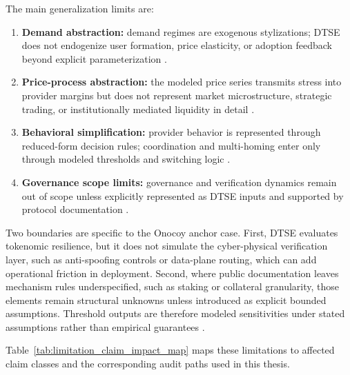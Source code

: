 The main generalization limits are:
\begin{enumerate}
    \item \textbf{Demand abstraction:} demand regimes are exogenous stylizations; DTSE does not endogenize user formation, price elasticity, or adoption feedback beyond explicit parameterization \cite{Morris2019, Braakman2022, Collins2024}.
    \item \textbf{Price-process abstraction:} the modeled price series transmits stress into provider margins but does not represent market microstructure, strategic trading, or institutionally mediated liquidity in detail \cite{Morris2019, Braakman2022, Collins2024}.
    \item \textbf{Behavioral simplification:} provider behavior is represented through reduced-form decision rules; coordination and multi-homing enter only through modeled thresholds and switching logic \cite{Morris2019, Braakman2022, Collins2024}.
    \item \textbf{Governance scope limits:} governance and verification dynamics remain out of scope unless explicitly represented as DTSE inputs and supported by protocol documentation \cite{Morris2019, Braakman2022, Collins2024}.
\end{enumerate}

Two boundaries are specific to the Onocoy anchor case. First, DTSE evaluates tokenomic resilience, but it does not simulate the cyber-physical verification layer, such as anti-spoofing controls or data-plane routing, which can add operational friction in deployment. Second, where public documentation leaves mechanism rules underspecified, such as staking or collateral granularity, those elements remain structural unknowns unless introduced as explicit bounded assumptions. Threshold outputs are therefore modeled sensitivities under stated assumptions rather than empirical guarantees \cite{OnocoyWhitepaper301, OnocoyRewards, Chiu2024}.

Table~\ref{tab:limitation_claim_impact_map} maps these limitations to affected claim classes and the corresponding audit paths used in this thesis.

